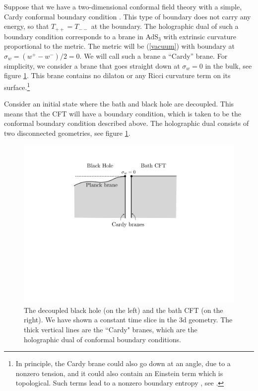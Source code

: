 \documentclass[11pt]{article}
\def\nref#1{(\ref{#1})}
\begin{document}
Suppose that we have a two-dimensional conformal field theory with a simple, Cardy conformal boundary condition \cite{Cardy:1989ir}. 
This type of boundary does not carry any energy, so that $T_{++} = T_{--}$ at the boundary.
The holographic dual of such a boundary condition corresponds to a brane in AdS$_3$ with extrinsic curvature proportional to the metric.
The metric will be \nref{vacuum} with boundary at $\sigma_w = (w^+ -w^-)/2 =0$. 
We will call such a brane a ``Cardy'' brane.
For simplicity, we consider a  brane that goes straight down at $\sigma_w =0$ in the bulk, see figure \ref{SimpleBrane}. 
This brane contains no dilaton or any Ricci curvature term on its surface.\footnote{In principle, the Cardy brane could also go down at an angle, due to a nonzero tension,  and it could also  contain an Einstein term which is topological. Such terms lead to a nonzero  boundary entropy \cite{Affleck:1991tk},  see \cite{Takayanagi:2011zk}.}

Consider an initial state where the bath and black hole are decoupled.
This means that the CFT will have a boundary condition, which is taken to be the conformal boundary condition described above.
The holographic dual consists of two disconnected geometries, see figure \ref{SimpleBrane}. 
    
\begin{figure}[ht]
    \begin{center}
    \includegraphics[scale=.5]{Figures/SimpleBrane}
    \end{center}
    \caption{The decoupled black hole (on the left) and the bath CFT (on the right). We have shown a constant time slice in the 3d geometry. The thick vertical lines are the ``Cardy" branes, which are the holographic dual of conformal boundary conditions.}
    \label{SimpleBrane}
\end{figure}
\end{document}

